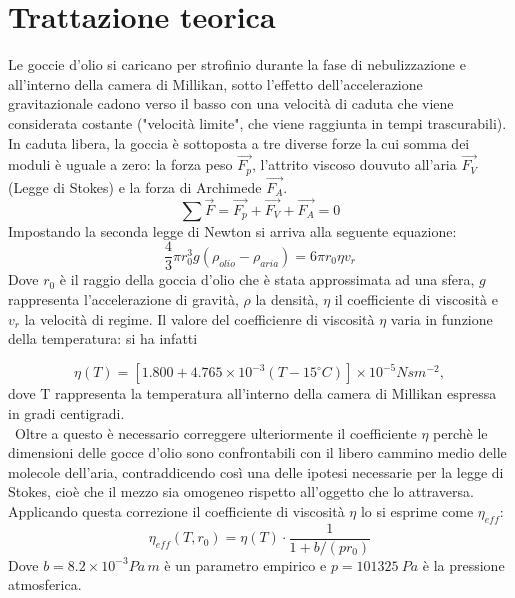 \documentclass{article}
\begin{document}
\section{Trattazione teorica}
Le goccie d'olio si caricano per strofinio durante la fase di nebulizzazione e all'interno della camera di Millikan, sotto l'effetto dell'accelerazione gravitazionale cadono verso il basso con una velocità di caduta che viene considerata costante ("velocità limite", che viene raggiunta in tempi trascurabili). In caduta libera, la goccia è sottoposta a tre diverse forze la cui somma dei moduli è uguale a zero: la forza peso $\vec{F_p}$, l'attrito viscoso douvuto all'aria $\vec{F_V}$(Legge di Stokes) e la forza di Archimede $\vec{F_A}$.
\begin{equation}
    \sum{\vec{F}} = \vec{F_p}+\vec{F_V}+\vec{F_A}= 0
    \label{sum}
\end{equation}
Impostando la seconda legge di Newton si arriva alla seguente equazione:
\begin{equation}
    \frac{4}{3}\pi r_0^{3}g(\rho_{olio}-\rho_{aria})=6\pi r_0\eta v_r
    \label{NII}
\end{equation}
Dove $r_0$ è il raggio della goccia d'olio che è stata approssimata ad una sfera, $g$ rappresenta l'accelerazione di gravità, $\rho$ la densità, $\eta$ il coefficiente di viscosità e $v_r$ la velocità di regime.
Il valore del coefficienre di viscosità $\eta$ varia in funzione della temperatura: si ha infatti

\begin{equation}
    \eta(T)=[1.800+4.765\times 10^{-3}(T-15^{\circ} C)]\times 10^{-5} Nsm^{-2},
    \label{eta}
\end{equation}
dove T rappresenta la temperatura all'interno della camera di Millikan espressa in gradi centigradi.\\\
Oltre a questo è necessario correggere ulteriormente il coefficiente $\eta$ perchè le dimensioni delle gocce d'olio sono confrontabili con il libero cammino medio delle molecole dell'aria, contraddicendo così una delle ipotesi necessarie per la legge di Stokes, cioè che il mezzo sia omogeneo rispetto all'oggetto che lo attraversa. Applicando questa correzione il coefficiente di viscosità $\eta$ lo si esprime come $\eta_{eff}$:
\begin{equation}
    \eta_{eff}(T,r_0)=\eta(T)\cdot \frac{1}{1+b/(pr_0)}
    \label{eff}
\end{equation}
Dove $b = 8.2 \times 10^{-3} Pa\,m$ è un parametro empirico e $p = 101325 \ Pa$ è la pressione atmosferica.
\end{document}
